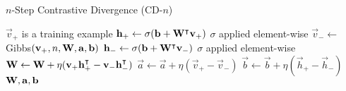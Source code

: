 \begin{algorithm}
    \caption{$n$-Step Contrastive Divergence (CD-$n$)}
\begin{algorithmic}[1]
        \Comment $\vec{v}_+$ is a training example
        \State $\mathbf{h}_+ \gets \sigma(\mathbf{b} + \mathbf{W}^\intercal\mathbf{v}_+)$
            \Comment $\sigma$ applied element-wise
        \State $\vec{v}_- \gets$ Gibbs$(\mathbf{v}_+,n,\mathbf{W},\mathbf{a},\mathbf{b})$
        \State $\mathbf{h}_- \gets \sigma(\mathbf{b} + \mathbf{W}^\intercal\mathbf{v}_-)$
            \Comment $\sigma$ applied element-wise
        \State $\mathbf{W} \gets \mathbf{W} + \eta(\mathbf{v}_+ \mathbf{h}_+^\intercal - \mathbf{v}_- \mathbf{h}_-^\intercal)$
        \State $\vec{a} \gets \vec{a} + \eta(\vec{v}_+ - \vec{v}_-)$
        \State $\vec{b} \gets \vec{b} + \eta(\vec{h}_+ - \vec{h}_-)$
        \State \Return $\mathbf{W}, \mathbf{a}, \mathbf{b}$
    \EndProcedure
\end{algorithmic}
\label{alg:CDn}
\end{algorithm}





